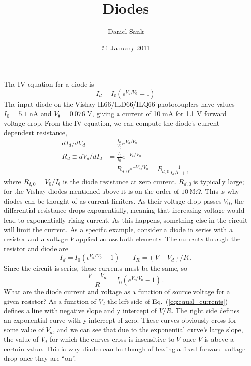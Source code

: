 \documentclass{article}
\title{Diodes}
\author{Daniel Sank}
\date{24 January 2011}
\begin{document}
\maketitle

The IV equation for a diode is
\begin{equation}
I_{d}=I_{0}(e^{V_{d}/V_{0}}-1)
\end{equation}
The input diode on the Vishay IL66/ILD66/ILQ66 photocouplers have values $I_{0}=5.1$ nA and $V_{0}=0.076$ V, giving a current of 10 mA for 1.1 V forward voltage drop.
From the IV equation, we can compute the diode's current dependent resistance,
\begin{align}
  dI_{d}/dV_{d}
  &= \frac{I_{0}}{V_{0}}e^{V_{d}/V_{0}} \nonumber \\
  R_d \equiv dV_{d}/dI_{d} &= \frac{V_0}{I_0} e^{-V_d / V_0} \nonumber \\
  &= R_{d,0} e^{-V_d / V_0} = R_{d,0} \frac{1}{I_d / I_0 + 1}
\end{align}
where $R_{d,0} = V_0 / I_0$ is the diode resistance at zero current.
$R_{d,0}$ is typically large; for the Vishay diodes mentioned above it is on the order of $10 \, \text{M}\Omega$.
This is why diodes can be thought of as current limiters.
As their voltage drop passes $V_0$, the differential resistance drops exponentially, meaning that increasing voltage would lead to exponentially rising current.
As this happens, something else in the circuit will limit the current.
As a specific example, consider a diode in series with a resistor and a voltage $V$ applied across both elements.
The currents through the resistor and diode are
\begin{equation}
  I_{d} = I_{0}(e^{V_d / V_0} - 1) \qquad I_R = (V - V_d) / R \, .
\end{equation}
Since the circuit is series, these currents must be the same, so
\begin{equation}
  \frac{V - V_d}{R} = I_0 (e^{V_d / V_0} - 1)
  \, .
  \label{eq:equal_currents}
\end{equation}
What are the diode current and voltage as a function of source voltage for a given resistor?
As a function of $V_d$ the left side of Eq.~(\ref{eq:equal_currents}) defines a line with negative slope and y intercept of $V/R$.
The right side defines an exponential curve with y-intercept of zero.
These curves obviously cross for some value of $V_{d}$, and we can see that due to the exponential curve's large slope, the value of $V_{d}$ for which the curves cross is insensitive to $V$ once $V$ is above a certain value.
This is why diodes can be though of having a fixed forward voltage drop once they are ``on''.
\end{document}
